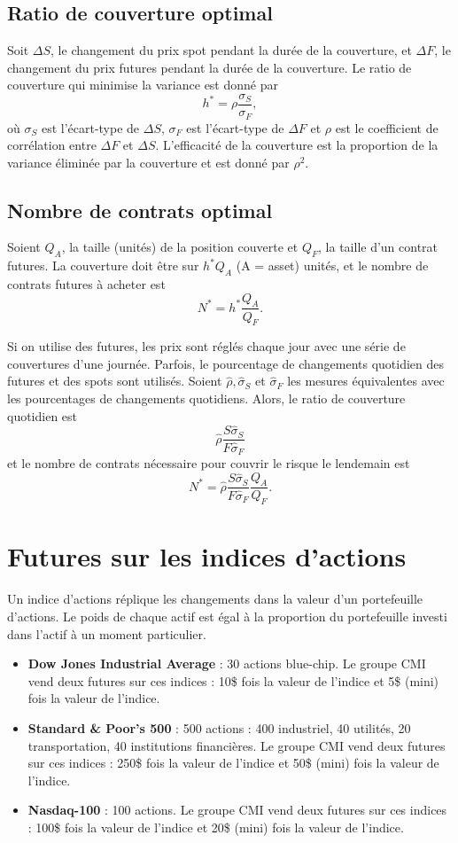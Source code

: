 \subsection{Ratio de couverture optimal}

Soit $\Delta S$, le changement du prix spot pendant la durée de la couverture, et $\Delta F$, le changement du prix futures pendant la durée de la couverture. Le ratio de couverture qui minimise la variance est donné par $$h^* = \rho \frac{\sigma_S}{\sigma_F},$$ où $\sigma_S$ est l'écart-type de $\Delta S$, $\sigma_F$ est l'écart-type de $\Delta F$ et $\rho$ est le coefficient de corrélation entre $\Delta F$ et $\Delta S$. L'efficacité de la couverture est la proportion de la variance éliminée par la couverture et est donné par $\rho^2$. 

\subsection{Nombre de contrats optimal}

Soient $Q_A$, la taille (unités) de la position couverte et $Q_F$, la taille d'un contrat futures. La couverture doit être sur $h^* Q_A$ (A = asset) unités, et le nombre de contrats futures à acheter est 
$$N^* = h^* \frac{Q_A}{Q_F}.$$

Si on utilise des futures, les prix sont réglés chaque jour avec une série de couvertures d'une journée. Parfois, le pourcentage de changements quotidien des futures et des spots sont utilisés. Soient $\hat{\rho}, \hat{\sigma}_S$ et $\hat{\sigma}_F$ les mesures équivalentes avec les pourcentages de changements quotidiens. Alors, le ratio de couverture quotidien est 
$$\hat{\rho} \frac{S \hat{\sigma}_S}{F \hat{\sigma}_F}$$
et le nombre de contrats nécessaire pour couvrir le risque le lendemain est 
$$N^* = \hat{\rho} \frac{S \hat{\sigma}_S}{F \hat{\sigma}_F} \frac{Q_A}{Q_F}.$$

\section{Futures sur les indices d'actions}

Un indice d'actions réplique les changements dans la valeur d'un portefeuille d'actions. Le poids de chaque actif est égal à la proportion du portefeuille investi dans l'actif à un moment particulier. 

\begin{itemize}
	\item \textbf{Dow Jones Industrial Average} : 30 actions blue-chip. Le groupe CMI vend deux futures sur ces indices : 10\$ fois la valeur de l'indice et 5\$ (mini) fois la valeur de l'indice. 
	\item \textbf{Standard \& Poor's 500} : 500 actions : 400 industriel, 40 utilités, 20 transportation, 40 institutions financières. Le groupe CMI vend deux futures sur ces indices : 250\$ fois la valeur de l'indice et 50\$ (mini) fois la valeur de l'indice. 
	\item \textbf{Nasdaq-100} : 100 actions. Le groupe CMI vend deux futures sur ces indices : 100\$ fois la valeur de l'indice et 20\$ (mini) fois la valeur de l'indice. 
\end{itemize}

